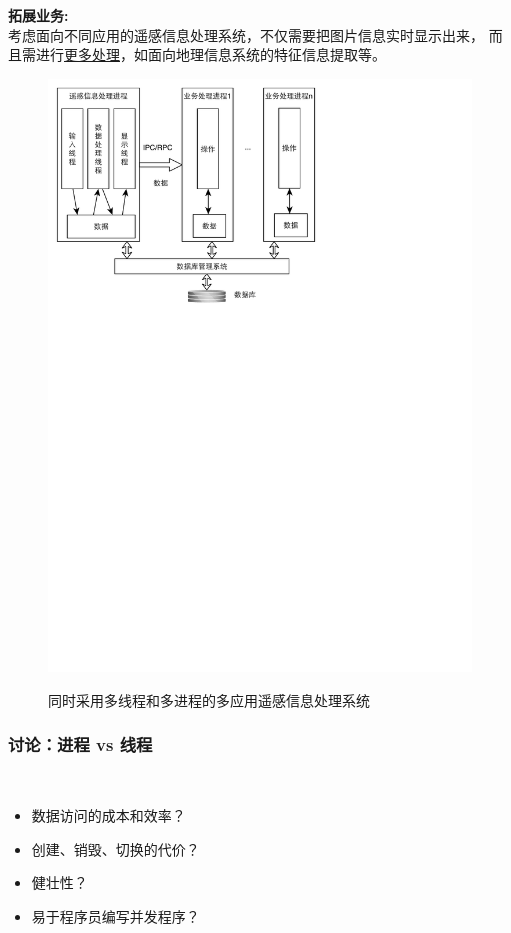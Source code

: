 \documentclass[compress]{beamer}
\begin{document}
\begin{frame}
   {
    \textbf{拓展业务:} \\[2ex]
    考虑面向不同应用的遥感信息处理系统，不仅需要把图片信息实时显示出来，
    而且需进行\uline{更多处理}，如面向地理信息系统的特征信息提取等。
  }
   {
  \centering\begin{figure}
  \includegraphics[width=0.8\hsize]{yaogan-mix.pdf}

  同时采用多线程和多进程的多应用遥感信息处理系统
  \end{figure}
  }
\end{frame}

\begin{frame}
  \frametitle{讨论：进程 vs 线程}
   \\[2ex]

  \begin{itemize}
    \item 数据访问的成本和效率？
    \item 创建、销毁、切换的代价？
    \item 健壮性？
    \item 易于程序员编写并发程序？
  \end{itemize}
\end{frame}
\end{document}
